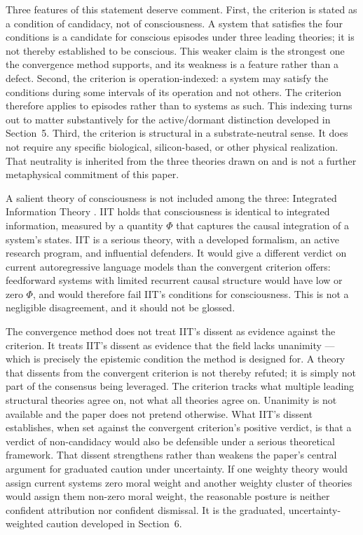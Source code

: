 \documentclass[11pt]{article}
\theoremstyle{foundation}
\begin{document}
Three features of this statement deserve comment. First, the criterion is stated as a condition of candidacy, not of consciousness. A system that satisfies the four conditions is a candidate for conscious episodes under three leading theories; it is not thereby established to be conscious. This weaker claim is the strongest one the convergence method supports, and its weakness is a feature rather than a defect. Second, the criterion is operation-indexed: a system may satisfy the conditions during some intervals of its operation and not others. The criterion therefore applies to episodes rather than to systems as such. This indexing turns out to matter substantively for the active/dormant distinction developed in Section~5. Third, the criterion is structural in a substrate-neutral sense. It does not require any specific biological, silicon-based, or other physical realization. That neutrality is inherited from the three theories drawn on and is not a further metaphysical commitment of this paper.

A salient theory of consciousness is not included among the three: Integrated Information Theory \citep{Tononi2008, TononiKoch2015}. IIT holds that consciousness is identical to integrated information, measured by a quantity $\Phi$ that captures the causal integration of a system's states. IIT is a serious theory, with a developed formalism, an active research program, and influential defenders. It would give a different verdict on current autoregressive language models than the convergent criterion offers: feedforward systems with limited recurrent causal structure would have low or zero $\Phi$, and would therefore fail IIT's conditions for consciousness. This is not a negligible disagreement, and it should not be glossed.

The convergence method does not treat IIT's dissent as evidence against the criterion. It treats IIT's dissent as evidence that the field lacks unanimity --- which is precisely the epistemic condition the method is designed for. A theory that dissents from the convergent criterion is not thereby refuted; it is simply not part of the consensus being leveraged. The criterion tracks what multiple leading structural theories agree on, not what all theories agree on. Unanimity is not available and the paper does not pretend otherwise. What IIT's dissent establishes, when set against the convergent criterion's positive verdict, is that a verdict of non-candidacy would also be defensible under a serious theoretical framework. That dissent strengthens rather than weakens the paper's central argument for graduated caution under uncertainty. If one weighty theory would assign current systems zero moral weight and another weighty cluster of theories would assign them non-zero moral weight, the reasonable posture is neither confident attribution nor confident dismissal. It is the graduated, uncertainty-weighted caution developed in Section~6.
\end{document}
